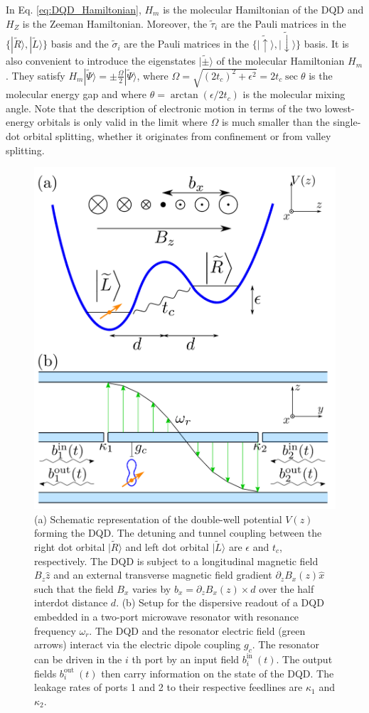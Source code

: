 \documentclass[12pt]{article}
\begin{document}
In Eq. \ref{eq:DQD_Hamiltonian}, $H_m$ is the molecular Hamiltonian of the DQD and $H_Z$ is the Zeeman Hamiltonian. Moreover, the $\widetilde{\tau}_i$ are the Pauli matrices in the $\{|\widetilde{R}\rangle,|\widetilde{L}\rangle\}$ basis and the $\widetilde{\sigma}_i$ are the Pauli matrices in the $\{|\widetilde{\uparrow}\rangle,|\widetilde{\downarrow}\rangle\}$ basis. 
It is also convenient to introduce the eigenstates $|\widetilde{ \pm}\rangle$ of the molecular Hamiltonian $H_m$. They satisfy $H_m|\widetilde{\Psi}\rangle= \pm \frac{\Omega}{2}|\widetilde{\Psi}\rangle$, where $\Omega=\sqrt{\left(2 t_c\right)^2+\epsilon^2}=2 t_c \sec \theta$ is the molecular energy gap and where $\theta=\arctan \left(\epsilon / 2 t_c\right)$ is the molecular mixing angle. 
Note that the description of electronic motion in terms of the two lowest-energy orbitals is only valid in the limit where $\Omega$ is much smaller than the single-dot orbital splitting, whether it originates from confinement or from valley splitting.
\begin{figure}[H]
    \centering
    \includegraphics[width=0.5\linewidth]{DQD.png}
    \caption{
        (a) Schematic representation of the double-well potential $V(z)$ forming the DQD. The detuning and tunnel coupling between the right dot orbital $|\widetilde{R}\rangle$ and left dot orbital $|\widetilde{L}\rangle$ are $\epsilon$ and $t_c$, respectively. The DQD is subject to a longitudinal magnetic field $B_z \hat{z}$ and an external transverse magnetic field gradient $\partial_z B_x(z) \hat{x}$ such that the field $B_x$ varies by $b_x=\partial_z B_x(z) \times d$ over the half interdot distance $d$. (b) Setup for the dispersive readout of a DQD embedded in a two-port microwave resonator with resonance frequency $\omega_r$. The DQD and the resonator electric field (green arrows) interact via the electric dipole coupling $g_c$. The resonator can be driven in the $i$ th port by an input field $b_i^{\text {in }}(t)$. The output fields $b_i^{\text {out }}(t)$ then carry information on the state of the DQD. The leakage rates of ports 1 and 2 to their respective feedlines are $\kappa_1$ and $\kappa_2$.
    }
    \label{fig:DQD}
\end{figure}
\end{document}
